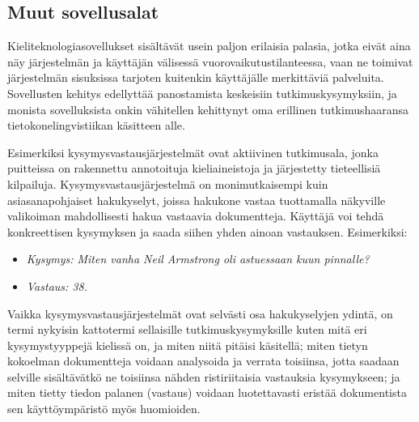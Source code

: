 \documentclass[]{../../metanetpaper}
\begin{document}
\begin{multicols}{2}








\subsection{Muut sovellusalat}


Kieliteknologiasovellukset sisältävät usein paljon 
erilaisia palasia, jotka eivät aina näy järjestelmän ja käyttäjän
välisessä vuorovaikutustilanteessa, vaan ne toimivat järjestelmän
sisuksissa tarjoten kuitenkin käyttäjälle merkittäviä
palveluita. Sovellusten kehitys edellyttää panostamista keskeisiin
tutkimuskysymyksiin, ja monista sovelluksista onkin vähitellen
kehittynyt oma erillinen tutkimushaaransa tietokonelingvistiikan
käsitteen alle.

Esimerkiksi kysymysvastausjärjestelmät ovat aktiivinen tutkimusala,
jonka puitteissa on rakennettu annotoituja kieliaineistoja ja
järjestetty tieteellisiä kilpailuja. Kysymysvastausjärjestelmä on monimutkaisempi 
kuin asiasanapohjaiset hakukyselyt, joissa hakukone vastaa
tuottamalla näkyville valikoiman mahdollisesti hakua vastaavia
dokumentteja. Käyttäjä voi tehdä konkreettisen kysymyksen ja saada siihen 
yhden ainoan vastauksen. Esimerkiksi:
\begin{itemize}
\item[] \textit{Kysymys: Miten vanha Neil Armstrong oli astuessaan
 kuun pinnalle?}

\item[] \textit{Vastaus: 38.}
\end{itemize}

Vaikka kysymysvastausjärjestelmät ovat selvästi osa hakukyselyjen
ydintä, on termi nykyisin kattotermi sellaisille tutkimuskysymyksille
kuten mitä eri kysymystyyppejä kielissä on, ja miten niitä pitäisi
käsitellä; miten tietyn kokoelman dokumentteja voidaan analysoida ja
verrata toisiinsa, jotta saadaan selville sisältävätkö ne toisiinsa
nähden ristiriitaisia vastauksia kysymykseen; ja miten tietty tiedon
palanen (vastaus) voidaan luotettavasti eristää dokumentista sen
käyttöympäristö myös huomioiden.


\end{multicols}
\end{document}
